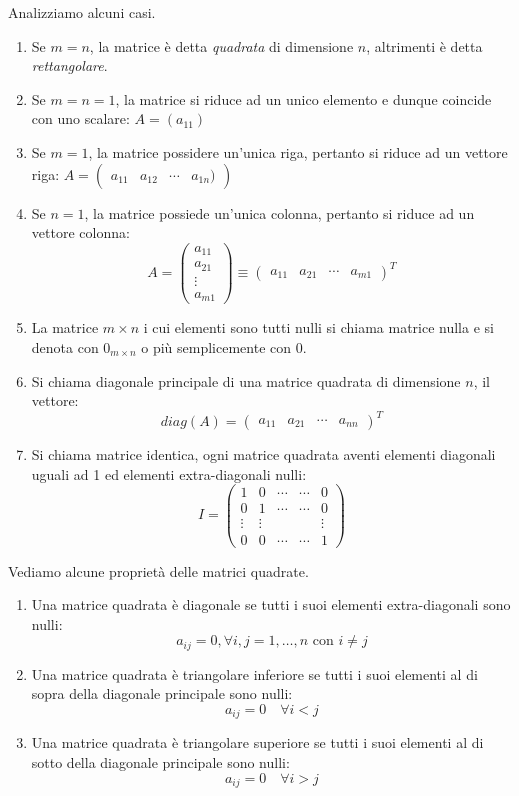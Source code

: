 \documentclass[12pt]{report}
\begin{document}
Analizziamo alcuni casi.
\begin{enumerate}
	\item Se $m = n$, la matrice è detta \textit{quadrata} di dimensione $n$, altrimenti è detta \textit{rettangolare}.
	\item Se $m=n=1$, la matrice si riduce ad un unico elemento e dunque coincide con uno scalare: $A = (a_{11})$
	\item Se $m = 1$, la matrice possidere un'unica riga, pertanto si riduce ad un vettore riga: $A = \begin{pmatrix}
		a_{11} & a_{12} & \cdots & a_{1n})
	\end{pmatrix}$
	\item Se $n=1$, la matrice possiede un'unica colonna, pertanto si riduce ad un vettore colonna: \[A = \begin{pmatrix}
		a_{11} \\
		a_{21} \\
		\vdots \\
		a_{m1}
	\end{pmatrix} \equiv  \begin{pmatrix}
		a_{11} & a_{21} & \cdots & a_{m1}
	\end{pmatrix}^T\]
	\item La matrice $m \times n$ i cui elementi sono tutti nulli si chiama matrice nulla e si denota con $0_{m \times n}$ o più semplicemente con 0.
	\item Si chiama diagonale principale di una matrice quadrata di dimensione $n$, il vettore:
	\[
	diag(A)= \begin{pmatrix}
		a_{11} & a_{21} & \cdots & a_{nn}
	\end{pmatrix}^T
	\]
	\item Si chiama matrice identica, ogni matrice quadrata aventi elementi diagonali uguali ad 1 ed elementi extra-diagonali nulli:
	\[
	I = \begin{pmatrix}
		1 & 0 & \cdots & \cdots & 0 \\
		0 & 1 & \cdots & \cdots & 0 \\
		\vdots & \vdots & & & \vdots \\
		0 & 0 & \cdots & \cdots & 1
	\end{pmatrix}
	\]
\end{enumerate}
Vediamo alcune proprietà delle matrici quadrate.
\begin{enumerate}
	\item Una matrice quadrata è diagonale se tutti i suoi elementi extra-diagonali sono nulli:
	\[
	a_{ij} = 0, \forall i, j = 1, \dots, n \text{ con } i \neq j
	\]
	\item Una matrice quadrata è triangolare inferiore se tutti i suoi elementi al di sopra della diagonale principale sono nulli:
	\[
	a_{ij} = 0 \quad \forall i < j
	\]
	\item Una matrice quadrata è triangolare superiore se tutti i suoi elementi al di sotto della diagonale principale sono nulli:
	\[
	a_{ij} = 0 \quad \forall i > j
	\]
\end{enumerate}
\end{document}

